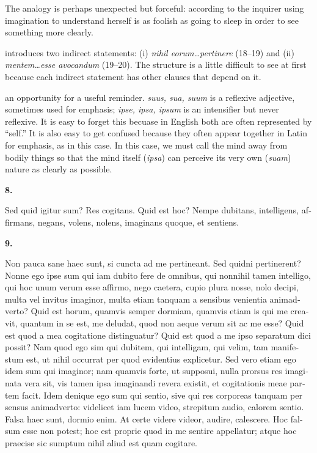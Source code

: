  The analogy is perhaps unexpected but forceful: according to the inquirer using imagination to understand herself is as foolish as going to sleep in order to see something more clearly.

 introduces two indirect statements: (i) \textit{nihil eorum\dots pertinere} (18--19) and (ii) \textit{mentem\dots esse avocandum} (19--20). The structure is a little difficult to see at first because each indirect statement has other clauses that depend on it.

 an opportunity for a useful reminder. \textit{suus, sua, suum} is a reflexive adjective, sometimes used for emphasis; \textit{ipse, ipsa, ipsum} is an intensifier but never reflexive. It is easy to forget this becuase in English both are often represented by ``self.'' It is also easy to get confused because they often appear together in Latin for emphasis, as in this case. In this case, we must call the mind away from bodily things so that the mind itself (\textit{ipsa}) can perceive its very own (\textit{suam}) nature as clearly as possible.

\clearpage

\beginnumbering
\pstart
    \textbf{8.} \begin{latin}Sed quid igitur sum? Res cogitans. Quid est hoc? Nempe dubitans, intelligens, affirmans, negans, volens, nolens, imaginans quoque, et sentiens.\end{latin}
\pend
\endnumbering
\beginnumbering
\pstart
    \textbf{9.} \begin{latin}Non pauca sane haec sunt, si cuncta ad me pertineant. Sed quidni pertinerent? Nonne ego ipse sum qui iam dubito fere de omnibus, qui nonnihil tamen intelligo, qui hoc unum verum esse affirmo, nego caetera, cupio plura nosse, nolo decipi, multa vel invitus imaginor, multa etiam tanquam a sensibus venientia animadverto? Quid est horum, quamvis semper dormiam, quamvis etiam is qui me creavit, quantum in se est, me deludat, quod non aeque verum sit ac me esse? Quid est quod a mea cogitatione distinguatur? Quid est quod a me ipso separatum dici possit? Nam quod ego sim qui dubitem, qui intelligam, qui velim, tam manifestum est, ut nihil occurrat per quod evidentius explicetur. Sed vero etiam ego idem sum qui imaginor; nam quamvis forte, ut supposui, nulla prorsus res imaginata vera sit, vis tamen ipsa imaginandi revera existit, et cogitationis meae partem facit. Idem denique ego sum qui sentio, sive qui res corporeas tanquam per sensus animadverto: videlicet iam lucem video, strepitum audio, calorem sentio. Falsa haec sunt, dormio enim. At certe videre videor, audire, calescere. Hoc falsum esse non potest; hoc est proprie quod in me sentire appellatur; atque hoc praecise sic sumptum nihil aliud est quam cogitare.\end{latin}
\pend
\endnumbering

